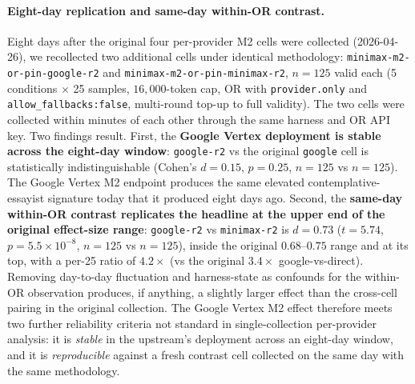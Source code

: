 \documentclass[11pt,a4paper]{article}
\begin{document}
\paragraph{Eight-day replication and same-day within-OR contrast.} Eight days after the original four per-provider M2 cells were collected (2026-04-26), we recollected two additional cells under identical methodology: \texttt{minimax-m2-\allowbreak or-pin-\allowbreak google-r2} and \texttt{minimax-m2-\allowbreak or-pin-\allowbreak minimax-r2}, $n{=}125$ valid each (5 conditions $\times$ 25 samples, $16{,}000$-token cap, OR with \texttt{provider.only} and \texttt{allow\_fallbacks:\allowbreak false}, multi-round top-up to full validity). The two cells were collected within minutes of each other through the same harness and OR API key. Two findings result. First, the \textbf{Google Vertex deployment is stable across the eight-day window}: \texttt{google-r2} vs the original \texttt{google} cell is statistically indistinguishable (Cohen's $d{=}0.15$, $p{=}0.25$, $n{=}125$ vs $n{=}125$). The Google Vertex M2 endpoint produces the same elevated contemplative-essayist signature today that it produced eight days ago. Second, the \textbf{same-day within-OR contrast replicates the headline at the upper end of the original effect-size range}: \texttt{google-r2} vs \texttt{minimax-r2} is $d{=}0.73$ ($t{=}5.74$, $p{=}5.5{\times}10^{-8}$, $n{=}125$ vs $n{=}125$), inside the original $0.68$--$0.75$ range and at its top, with a per-25 ratio of $4.2\times$ (vs the original $3.4\times$ google-vs-direct). Removing day-to-day fluctuation and harness-state as confounds for the within-OR observation produces, if anything, a slightly larger effect than the cross-cell pairing in the original collection. The Google Vertex M2 effect therefore meets two further reliability criteria not standard in single-collection per-provider analysis: it is \emph{stable} in the upstream's deployment across an eight-day window, and it is \emph{reproducible} against a fresh contrast cell collected on the same day with the same methodology.
\end{document}
